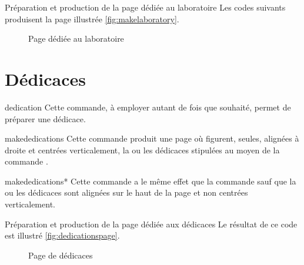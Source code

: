 \begin{dbexample}{Préparation et production de la page dédiée au laboratoire}{}
  Les codes suivants produisent la page illustrée \vref{fig:makelaboratory}.
  \NoAutoSpacing%
%
\end{dbexample}

\begin{figure}[htbp]
  \centering {}
  \caption{Page dédiée au laboratoire}
  \label{fig:makelaboratory}
\end{figure}

\section{Dédicaces}

\begin{docCommand}{dedication}{}
  Cette commande, à employer autant de fois que
  souhaité\hauteurpage{}, permet de préparer une dédicace.
\end{docCommand}

\begin{docCommand}{makededications}{}
  Cette commande produit une page où figurent, seules, alignées à droite et
  centrées verticalement, la ou les dédicaces stipulées au moyen de la commande
  .
\end{docCommand}
%
\begin{docCommand}{makededications*}{}
  Cette commande a le même effet que la commande  sauf
  que la ou les dédicaces sont alignées sur le haut de la page et non centrées
  verticalement.
\end{docCommand}

\begin{dbexample}{Préparation et production de la page dédiée aux dédicaces}{}
  \NoAutoSpacing%
%
  Le résultat de ce code est illustré \vref{fig:dedicationspage}.
\end{dbexample}

\begin{figure}[htbp]
  \centering {}%
  \caption{Page de dédicaces}
  \label{fig:dedicationspage}
\end{figure}

